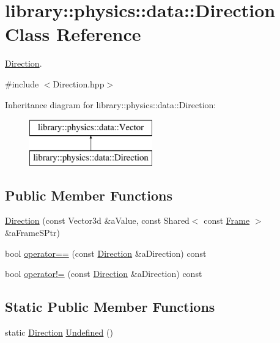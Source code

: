 \hypertarget{classlibrary_1_1physics_1_1data_1_1_direction}{}\section{library\+:\+:physics\+:\+:data\+:\+:Direction Class Reference}
\label{classlibrary_1_1physics_1_1data_1_1_direction}


\hyperlink{classlibrary_1_1physics_1_1data_1_1_direction}{Direction}.  




{\ttfamily \#include $<$Direction.\+hpp$>$}

Inheritance diagram for library\+:\+:physics\+:\+:data\+:\+:Direction\+:\begin{figure}[H]
\begin{center}
\leavevmode
\includegraphics[height=2.000000cm]{classlibrary_1_1physics_1_1data_1_1_direction}
\end{center}
\end{figure}
\subsection*{Public Member Functions}
\begin{DoxyCompactItemize}
\item 
\hyperlink{classlibrary_1_1physics_1_1data_1_1_direction_a6adfdc25c23947ce94f801735544d812}{Direction} (const Vector3d \&a\+Value, const Shared$<$ const \hyperlink{classlibrary_1_1physics_1_1coord_1_1_frame}{Frame} $>$ \&a\+Frame\+S\+Ptr)
\item 
bool \hyperlink{classlibrary_1_1physics_1_1data_1_1_direction_af943970f99affb310f94e16ce55b455b}{operator==} (const \hyperlink{classlibrary_1_1physics_1_1data_1_1_direction}{Direction} \&a\+Direction) const
\item 
bool \hyperlink{classlibrary_1_1physics_1_1data_1_1_direction_af09f2a48292e271133fb05dc40462c78}{operator!=} (const \hyperlink{classlibrary_1_1physics_1_1data_1_1_direction}{Direction} \&a\+Direction) const
\end{DoxyCompactItemize}
\subsection*{Static Public Member Functions}
\begin{DoxyCompactItemize}
\item 
static \hyperlink{classlibrary_1_1physics_1_1data_1_1_direction}{Direction} \hyperlink{classlibrary_1_1physics_1_1data_1_1_direction_afe2e1478e49419a3554a5e0de6ea2e70}{Undefined} ()
\end{DoxyCompactItemize}
